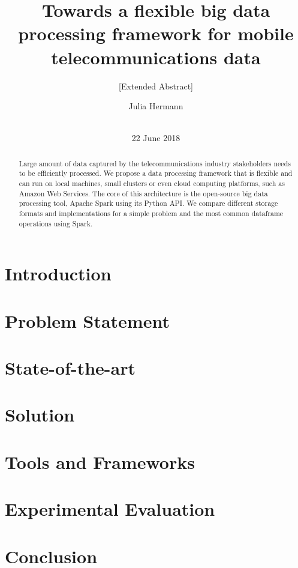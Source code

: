 \documentclass{sig-alternate-05-2015}
\begin{document}
\title{Towards a flexible big data processing framework for mobile telecommunications data}
\subtitle{[Extended Abstract]}

\author{
\alignauthor
Julia Hermann\\
       \\
}

\maketitle
\date{22 June 2018}
\begin{abstract}
Large amount of data captured by the telecommunications industry stakeholders needs to be efficiently processed. We propose a data processing framework that is flexible and can run on local machines, small clusters or even cloud computing platforms, such as Amazon Web Services. The core of this architecture is the open-source big data processing tool, Apache Spark using its Python API. We compare different storage formats and implementations for a simple problem and the most common dataframe operations using Spark.
\end{abstract}
\section{Introduction}
\section{Problem Statement}
\section{State-of-the-art}
\section{Solution}
\section{Tools and Frameworks}
\section{Experimental Evaluation}
\section{Conclusion}



\end{document}
